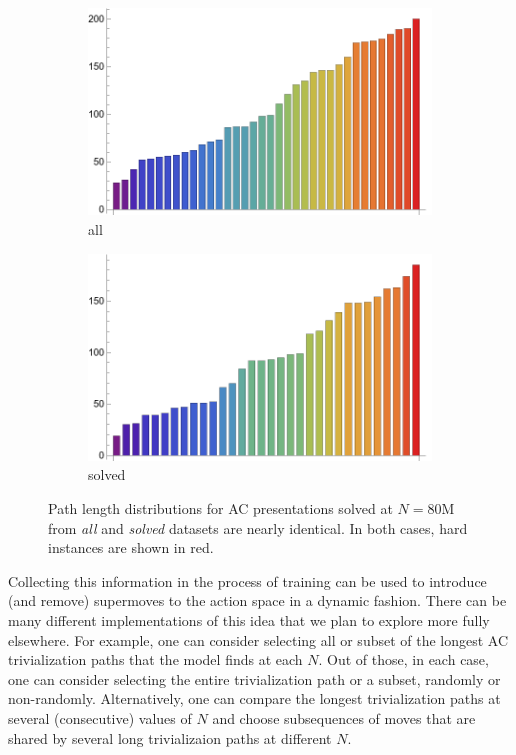 \begin{figure}[h]
    \centering
    \begin{subfigure}{0.45\textwidth}
        \centering
        \includegraphics[width=\textwidth]{fig/all_path_length_80M.png}
        \caption{all}
        \label{fig:all_path_length_80M}
    \end{subfigure}
    \hfill
    \begin{subfigure}{0.45\textwidth}
        \centering
        \includegraphics[width=\textwidth]{fig/solved_path_length_80M.png}
        \caption{solved}
        \label{fig:solved_path_length_80M}
    \end{subfigure}
    \caption{Path length distributions for AC presentations solved at $N=80$M from \textit{all} and \textit{solved} datasets are nearly identical. In both cases, hard instances are shown in red.}
    \label{fig:path_length_80M}
\end{figure}

Collecting this information in the process of training can be used to introduce (and remove) supermoves to the action space in a dynamic fashion. There can be many different implementations of this idea that we plan to explore more fully elsewhere. For example, one can consider selecting all or subset of the longest AC trivialization paths that the model finds at each $N$. Out of those, in each case, one can consider selecting the entire trivialization path or a subset, randomly or non-randomly. Alternatively, one can compare the longest trivialization paths at several (consecutive) values of $N$ and choose subsequences of moves that are shared by several long trivializaion paths at different $N$.

